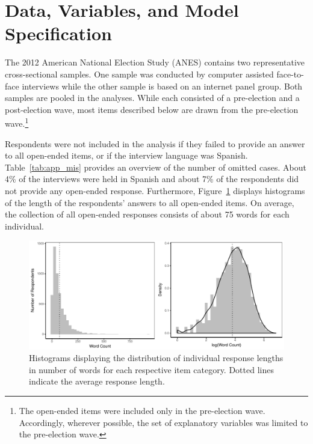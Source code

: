 \documentclass[12pt]{article}
\begin{document}
\clearpage

\renewcommand\thefigure{\thesection.\arabic{figure}}
\renewcommand\thetable{\thesection.\arabic{table}}
\setcounter{figure}{0}
\setcounter{table}{0}

\section{Data, Variables, and Model Specification}

The 2012 American National Election Study (ANES) contains two representative cross-sectional samples. One sample was conducted by computer assisted face-to-face interviews while the other sample is based on an internet panel group. Both samples are pooled in the analyses. While each consisted of a pre-election and a post-election wave, most items described below are drawn from the pre-election wave.\footnote{The open-ended items were included only in the pre-election wave. Accordingly, wherever possible, the set of explanatory variables was limited to the pre-election wave.} 



Respondents were not included in the analysis if they failed to provide an answer to all open-ended items, or if the interview language was Spanish. Table~\ref{tab:app_mis} provides an overview of the number of omitted cases. About 4\% of the interviews were held in Spanish and about 7\% of the respondents did not provide any open-ended response. Furthermore, Figure~\ref{fig:appB2num} displays histograms of the length of the respondents' answers to all open-ended items. On average, the collection of all open-ended responses consists of about 75 words for each individual.

\begin{figure}[h]\centering
\includegraphics[width=\textwidth]{../calc/fig/app_wc.pdf}
\caption{Histograms displaying the distribution of individual response lengths in number of words for each respective item category. Dotted lines indicate the average response length.}\label{fig:appB2num}
\end{figure}
\end{document}
